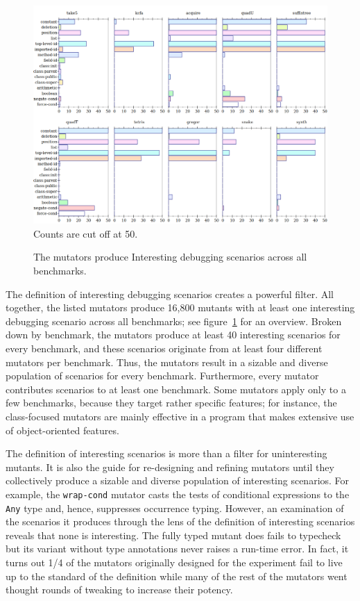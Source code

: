 \begin{figure} \footnotesize
 \centering
 \includegraphics[scale=0.33]{./plots/mutant-breakdown}
  Counts are cut off at 50.

\caption{The mutators produce Interesting debugging scenarios across all benchmarks.} 
 \label{fig:mutant-breakdown}
\end{figure}

The definition of interesting debugging scenarios creates a powerful filter. All
together, the listed mutators produce 16,800 mutants with at least one
interesting debugging scenario across all benchmarks; see
figure~\ref{fig:mutant-breakdown} for an overview. Broken down by benchmark, the
mutators produce at least 40 interesting scenarios for every benchmark, and
these scenarios originate from at least four different mutators per benchmark.
Thus, the mutators result in a sizable and diverse population of scenarios for
every benchmark.  Furthermore, every mutator contributes scenarios to at least
one benchmark.  Some mutators apply only to a few benchmarks, because they
target rather specific features; for instance, the class-focused mutators are
mainly effective in a program that makes extensive use of object-oriented
features.

The definition of interesting scenarios is more than a filter for
uninteresting mutants. It is also the guide for re-designing and refining
mutators until they collectively produce a sizable and diverse population of
interesting scenarios. For example, the {\tt wrap-cond} mutator casts the
tests of conditional expressions to the {\tt Any} type and, hence,
suppresses occurrence typing. However, an examination of the scenarios it
produces through the lens of the definition of interesting scenarios
reveals that none is interesting. The fully typed mutant does fails to
typecheck but its variant without type annotations never raises a run-time
error. In fact, it turns out 1/4 of the mutators originally designed for
the experiment fail to live up to the standard of the definition while
many of the rest of the mutators went thought rounds of tweaking
to increase their potency.
